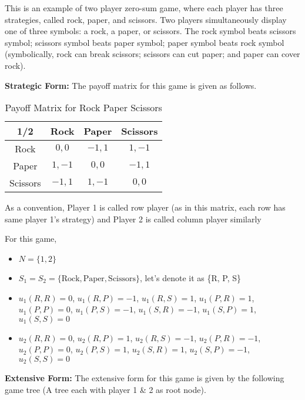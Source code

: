 \begin{exm}{\label{exm:rps}}
    This is an example of two player zero-sum game, where each player has three strategies, called rock, paper, and scissors.
    Two players simultaneously display one of three symbols: a rock, a paper, or scissors.
    The rock symbol beats scissors symbol; scissors symbol beats paper symbol; paper symbol beats rock symbol (symbolically, rock can break scissors; scissors can cut paper; and paper can cover rock).

    \textbf{Strategic Form:} The payoff matrix for this game is given as follows.
    \begin{table}[h]
        \centering
        \begin{tabular}{ |c|c|c|c| } 
            \hline
            1/2 & Rock & Paper & Scissors\\\hline
            Rock & $0,0$ & $-1,1$ & $1,-1$\\ \hline
            Paper & $1,-1$ & $0,0$ &$-1,1$\\ \hline
            Scissors & $-1,1$ & $1,-1$ & $0,0$\\\hline
        \end{tabular}
        \caption{Payoff Matrix for Rock Paper Scissors}
    \end{table}
    \begin{note}
    As a convention, Player 1 is called row player (as in this matrix, each row has same player 1's strategy) and Player 2 is called column player similarly
    \end{note}
    For this game,
    \begin{itemize}
    \item $N = \{1, 2\}$
    \item $S_1 = S_2 = \{\text{Rock}, \text{Paper}, \text{Scissors}\}$, let's denote it as \{R, P, S\}
    \item $u_1(R, R) = 0$, $u_1(R, P) = -1$, $u_1(R, S) = 1$, $u_1(P, R) = 1$, $u_1(P, P) = 0$, $u_1(P, S) = -1$, $u_1(S, R) = -1$, $u_1(S, P) = 1$, $u_1(S, S) = 0$
    \item $u_2(R, R) = 0$, $u_2(R, P) = 1$, $u_2(R, S) = -1$, $u_2(P, R) = -1$, $u_2(P, P) = 0$, $u_2(P, S) = 1$, $u_2(S, R) = 1$, $u_2(S, P) = -1$, $u_2(S, S) = 0$
    \end{itemize}
    \textbf{Extensive Form:}
    The extensive form for this game is given by the following game tree (A tree each with player 1 \& 2 as root node).
    \begin{figure}[H]
    \centering

\end{figure}
\end{exm}
